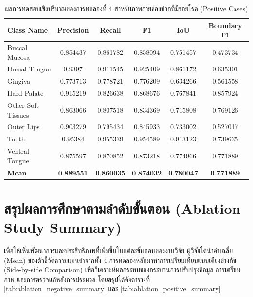 \begin{table}[H]
\centering
\caption{ผลการทดสอบเชิงปริมาณของการทดลองที่ 4 สำหรับภาพถ่ายช่องปากที่มีรอยโรค (Positive Cases)}
\label{tab:eval_postprocessing_positive}
\begin{tabular}{|l|c|c|c|c|c|}
\hline
\textbf{Class Name} & \textbf{Precision} & \textbf{Recall} & \textbf{F1} & \textbf{IoU} & \textbf{Boundary F1} \\ \hline
Buccal Mucosa & 0.854437 & 0.861782 & 0.858094 & 0.751457 & 0.473734 \\
Dorsal Tongue & 0.9397 & 0.911545 & 0.925409 & 0.861172 & 0.635301 \\
Gingiva & 0.773713 & 0.778721 & 0.776209 & 0.634266 & 0.561558 \\
Hard Palate & 0.915219 & 0.826638 & 0.868676 & 0.767841 & 0.857924 \\
Other Soft Tissues & 0.863066 & 0.807518 & 0.834369 & 0.715808 & 0.769126 \\
Outer Lips & 0.903279 & 0.795434 & 0.845933 & 0.733002 & 0.527017 \\
Tooth & 0.95384 & 0.955339 & 0.954589 & 0.913123 & 0.739635 \\
Ventral Tongue & 0.875597 & 0.870852 & 0.873218 & 0.774966 & 0.771889 \\ \hline
\textbf{Mean} & \textbf{0.889551} & \textbf{0.860035} & \textbf{0.874032} & \textbf{0.780047} & \textbf{0.771889} \\ \hline
\end{tabular}
\end{table}

\section{สรุปผลการศึกษาตามลำดับขั้นตอน (Ablation Study Summary)}
เพื่อให้เห็นพัฒนาการและประสิทธิภาพที่เพิ่มขึ้นในแต่ละขั้นตอนของงานวิจัย ผู้วิจัยได้นำค่าเฉลี่ย (Mean) ของตัวชี้วัดความแม่นยำจากทั้ง 4 การทดลองหลักมาทำการเปรียบเทียบแบบเคียงข้างกัน (Side-by-side Comparison) เพื่อวิเคราะห์ผลกระทบของกระบวนการปรับปรุงข้อมูล การเตรียมภาพ และการตรวจแก้หลังการประมวล โดยสรุปได้ดังตารางที่ \ref{tab:ablation_negative_summary} และ \ref{tab:ablation_positive_summary}

